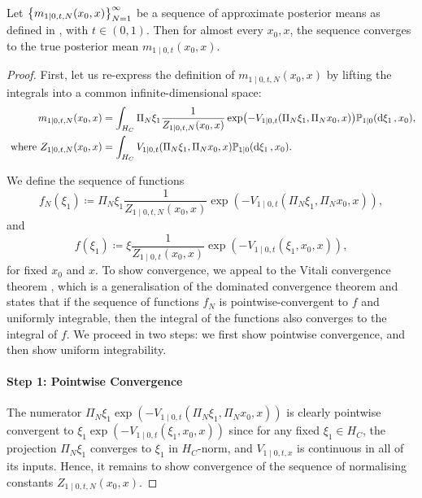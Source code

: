 \begin{lemma}\label{lem:posteriormeanconvergence}
  Let \(\qty{m_{1 \mid 0, t, N}(x_{0}, x)}_{N=1}^{\infty}\)  be a sequence of approximate posterior means as defined in , with \(t \in (0, 1)\). Then for almost every \(x_{0}, x\), the sequence converges to the true posterior mean \(m_{1 \mid 0, t}(x_{0}, x)\).

  \begin{proof}
    First, let us re-express the definition of \(m_{1 \mid 0, t, N}(x_{0}, x)\) by lifting the integrals into a common infinite-dimensional space:
    \begin{align}
      m_{1 \mid 0, t, N}( x_{0}, x) &= \int_{H_{C}} \Pi_{N} \xi_{1} \frac{1}{Z_{1 \mid 0, t, N}(x_{0}, x)} \exp(-V_{1 \mid 0, t}(\Pi_{N} \xi_{1}, \Pi_{N} x_{0}, x)) \mathbb{P}_{1 \mid 0}(\dd{\xi_{1}}, x_{0}),  \label{eqn:lift}\\
      \text{ where } Z_{1 \mid 0, t, N}(x_{0}, x) &= \int_{H_{C}} V_{1 \mid 0, t}(\Pi_{N} \xi_{1}, \Pi_{N} x_{0}, x) \mathbb{P}_{1 \mid 0}(\dd{\xi_{1}}, x_{0}).\notag
    \end{align}

    We define the sequence of functions \[f_{N}(\xi_{1}) \coloneqq \Pi_{N} \xi_{1} \frac{1}{Z_{1 \mid 0, t, N}(x_{0}, x)}\exp(- V_{1 \mid 0, t}(\Pi_{N} \xi_{1}, \Pi_{N} x_{0}, x)),\] and \[f(\xi_{1}) \coloneqq \xi \frac{1}{Z_{1 \mid 0, t}(x_{0}, x)}\exp(-V_{1 \mid 0, t}(\xi_{1}, x_{0}, x)),\] for fixed \(x_{0}\) and  \(x\). To show convergence, we appeal to the Vitali convergence theorem \citep{walnut2011vitali}, which is a generalisation of the dominated convergence theorem and states that if the sequence of functions \(f_{N}\) is pointwise-convergent to \(f\) and uniformly integrable, then the integral of the functions also converges to the integral of \(f\). We proceed in two steps: we first show pointwise convergence, and then show uniform integrability.

    \paragraph{Step 1: Pointwise Convergence} The numerator \(\Pi_{N} \xi_{1} \exp(-V_{1 \mid 0, t}(\Pi_{N} \xi_{1}, \Pi_{N} x_{0}, x))\) is clearly pointwise convergent to \(\xi_{1} \exp(-V_{1 \mid 0, t}(\xi_{1}, x_{0}, x))\) since for any fixed \(\xi_{1} \in H_{C}\), the projection \(\Pi_{N} \xi_{1}\) converges to \(\xi_{1}\) in \(H_{C}\)-norm, and \(V_{1 \mid 0, t, x}\) is continuous in all of its inputs. Hence, it remains to show convergence of the sequence of normalising constants \(Z_{1 \mid 0, t, N}(x_{0}, x)\).


\end{proof}
\end{lemma}
